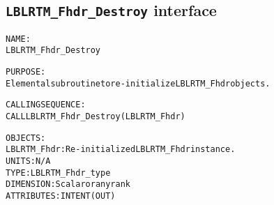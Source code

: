 \subsection{\texttt{LBLRTM\_Fhdr\_Destroy} interface}
  \label{sec:LBLRTM_Fhdr_Destroy_interface}
  \begin{alltt}
 
  NAME:
        LBLRTM_Fhdr_Destroy
 
  PURPOSE:
        Elemental subroutine to re-initialize LBLRTM_Fhdr objects.
 
  CALLING SEQUENCE:
        CALL LBLRTM_Fhdr_Destroy( LBLRTM_Fhdr )
 
  OBJECTS:
        LBLRTM_Fhdr:  Re-initialized LBLRTM_Fhdr instance.
                      UNITS:      N/A
                      TYPE:       LBLRTM_Fhdr_type
                      DIMENSION:  Scalar or any rank
                      ATTRIBUTES: INTENT(OUT)
 
  \end{alltt}
